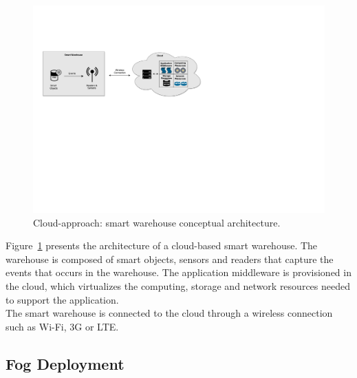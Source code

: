 \begin{figure}[ht!]
  \centering
  \includegraphics[width=\textwidth]{./images/solution_cloud_architecture}
  \caption{Cloud-approach: smart warehouse conceptual architecture.}
  \label{fig:solution_cloud_architecture}
\end{figure}

Figure~\ref{fig:solution_cloud_architecture} presents the architecture of a cloud-based smart warehouse.
The warehouse is composed of smart objects, sensors and readers that capture the events that occurs
in the warehouse. The application middleware is provisioned in the cloud, which virtualizes the computing,
storage and network resources needed to support the application.\\

The smart warehouse is connected to the cloud through a wireless connection such as Wi-Fi, 3G or
\gls{LTE}.

\subsection{Fog Deployment}
\label{sub:sol_fog}

